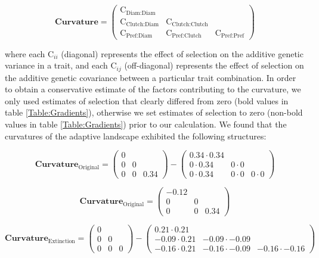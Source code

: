 \documentclass[11pt,]{article}
\begin{document}
\[\textbf{Curvature} = \begin{pmatrix} \text{C}_{\text{Diam:Diam}}&& \\ \text{C}_{\text{Clutch:Diam}} & \text{C}_{\text{Clutch:Clutch}} & \\ \text{C}_{\text{Pref:Diam}} & \text{C}_{\text{Pref:Clutch}} & \text{C}_{\text{Pref:Pref}} \end{pmatrix}\]
\bigskip

where each \(\text{C}_{ii}\) (diagonal) represents the effect of
selection on the additive genetic variance in a trait, and each
\(\text{C}_{ij}\) (off-diagonal) represents the effect of selection on
the additive genetic covariance between a particular trait combination.
In order to obtain a conservative estimate of the factors contributing
to the curvature, we only used estimates of selection that clearly
differed from zero (bold values in table \ref{Table:Gradients}),
otherwise we set estimates of selection to zero (non-bold values in
table \ref{Table:Gradients}) prior to our calculation. We found that the
curvatures of the adaptive landscape exhibited the following structures:

\[\textbf{Curvature}_{\text{Original}} = \begin{pmatrix} 
0 &  &  \\  
0 & 0 &  \\  
0 & 0 & 0.34 \end{pmatrix} - \begin{pmatrix} 
0.34\cdot0.34 &  &  \\  
0\cdot0.34 & 0\cdot0 &  \\  
0\cdot0.34 & 0\cdot0 & 0\cdot0 \end{pmatrix}\]

\[\textbf{Curvature}_{\text{Original}} = \begin{pmatrix} 
-0.12 &  &  \\  
0 & 0 &  \\  
0 & 0 & 0.34 \end{pmatrix}\]

\[\textbf{Curvature}_{\text{Extinction}} = \begin{pmatrix} 
0 &  &  \\  
0 & 0 &  \\  
0 & 0 & 0 \end{pmatrix} - \begin{pmatrix} 
0.21\cdot0.21 &  &  \\  
-0.09\cdot0.21 & -0.09\cdot-0.09 &  \\  
-0.16\cdot0.21 & -0.16\cdot-0.09 & -0.16\cdot-0.16 \end{pmatrix}\]
\end{document}

